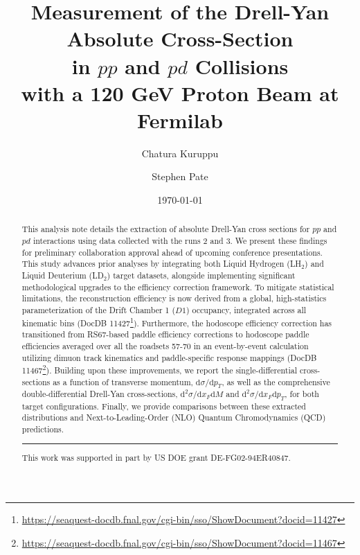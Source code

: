 \documentclass[11pt]{article}
\newcommand{\diffd}{\mathrm{d}}
\begin{document}
\linenumbers

\title{\textbf{Measurement of the Drell-Yan Absolute Cross-Section\\ in $pp$ and $pd$ Collisions\\ with a 120 GeV Proton Beam at Fermilab}}
\author{Chatura Kuruppu}
\author{Stephen Pate}
\date{\today}
\maketitle

\begin{abstract}
This analysis note details the extraction of absolute Drell-Yan cross sections for $pp$ and $pd$ interactions using data collected with the runs 2 and 3. 
We present these findings for preliminary collaboration approval ahead of upcoming conference presentations. 
This study advances prior analyses by integrating both Liquid Hydrogen (LH$_2$) and Liquid Deuterium (LD$_2$) target datasets, alongside implementing significant methodological upgrades to the efficiency correction framework. 
To mitigate statistical limitations, the reconstruction efficiency is now derived from a global, high-statistics parameterization of the Drift Chamber 1 ($D1$) occupancy, integrated across all kinematic bins (DocDB 11427\footnote{\url{https://seaquest-docdb.fnal.gov/cgi-bin/sso/ShowDocument?docid=11427}}). 
Furthermore, the hodoscope efficiency correction has transitioned from RS67-based paddle efficiency corrections to hodoscope paddle efficiencies averaged over all the roadsets 57-70 in an event-by-event calculation utilizing dimuon track kinematics and paddle-specific response mappings (DocDB 11467\footnote{\url{https://seaquest-docdb.fnal.gov/cgi-bin/sso/ShowDocument?docid=11467}}). 
Building upon these improvements, we report the single-differential cross-sections as a function of transverse momentum, $\diffd\sigma/\diffd p_{T}$, as well as the comprehensive double-differential Drell-Yan cross-sections, $\diffd^{2}\sigma/\diffd x_{F}\diffd M$ and $\diffd^{2}\sigma/\diffd x_{F}\diffd p_{T}$, for both target configurations. 
Finally, we provide comparisons between these extracted distributions and Next-to-Leading-Order (NLO) Quantum Chromodynamics (QCD) predictions.

\vspace{1em}
\hrule
\vspace{1em}
\footnotesize{This work was supported in part by US DOE grant DE-FG02-94ER40847.}
\end{abstract}
\end{document}
